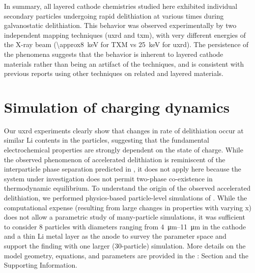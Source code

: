 \documentclass{article}
\begin{document}
In summary, all layered cathode chemistries studied here exhibited
individual secondary particles undergoing rapid delithiation at
various times during galvanostatic delithiation. This behavior was
observed experimentally by two independent mapping techniques
(\gls{uxrd} and \gls{txm}), with very different energies of the X-ray
beam (\SI{\approx8}{\kilo\electronvolt} for TXM vs
\SI{25}{\kilo\electronvolt} for \gls{uxrd}). The persistence of the
phenomena suggests that the behavior is inherent to layered cathode
materials rather than being an artifact of the techniques, and is
consistent with previous reports using other techniques on related
\nmc{} and  layered
materials\cite{chueh2021,rao2021,wang2020-6}.

\section{Simulation of charging dynamics}


Our \gls{uxrd} experiments clearly show that changes in rate of
delithiation occur at similar Li contents in the particles, suggesting
that the fundamental electrochemical properties are strongly dependent
on the state of charge. While the observed phenomenon of accelerated
delithiation is reminiscent of the interparticle phase separation
predicted in  \cite{boesenberg2013,thornton2014},
it does not apply here because the system under investigation does not
permit two-phase co-existence in thermodynamic equilibrium. To
understand the origin of the observed accelerated delithiation, we
performed physics-based particle-level simulations of . While
the computational expense (resulting from large changes in properties
with varying x) does not allow a parametric study of many-particle
simulations, it was sufficient to consider 8 particles with diameters
ranging from \SIrange{4}{11}{\micro\meter} in the cathode and a thin
Li metal layer as the anode to survey the parameter space and support
the finding with one larger (30-particle) simulation. More details on
the model geometry, equations, and parameters are provided in the
:  Section and
the Supporting Information.
\end{document}

